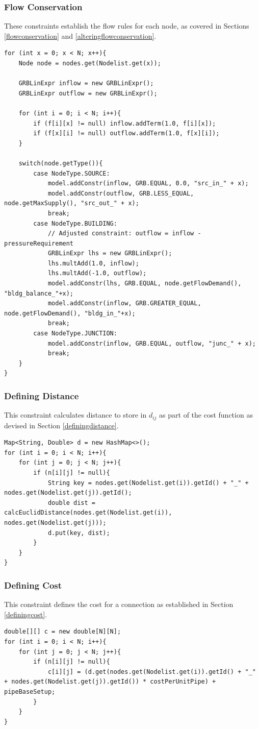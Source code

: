 \subsubsection{Flow Conservation}
These constraints establish the flow rules for each node, as covered in Sections \ref{flowconservation} and \ref{alteringflowconservation}.
\begin{lstlisting}
for (int x = 0; x < N; x++){
    Node node = nodes.get(Nodelist.get(x));

    GRBLinExpr inflow = new GRBLinExpr();
    GRBLinExpr outflow = new GRBLinExpr();

    for (int i = 0; i < N; i++){
        if (f[i][x] != null) inflow.addTerm(1.0, f[i][x]);
        if (f[x][i] != null) outflow.addTerm(1.0, f[x][i]);
    }

    switch(node.getType()){
        case NodeType.SOURCE:
            model.addConstr(inflow, GRB.EQUAL, 0.0, "src_in_" + x);
            model.addConstr(outflow, GRB.LESS_EQUAL, node.getMaxSupply(), "src_out_" + x);
            break;
        case NodeType.BUILDING:
            // Adjusted constraint: outflow = inflow - pressureRequirement
            GRBLinExpr lhs = new GRBLinExpr();
            lhs.multAdd(1.0, inflow);
            lhs.multAdd(-1.0, outflow);
            model.addConstr(lhs, GRB.EQUAL, node.getFlowDemand(), "bldg_balance_"+x);
            model.addConstr(inflow, GRB.GREATER_EQUAL, node.getFlowDemand(), "bldg_in_"+x);
            break;
        case NodeType.JUNCTION:
            model.addConstr(inflow, GRB.EQUAL, outflow, "junc_" + x);
            break;
    }
}
\end{lstlisting}

\subsubsection{Defining Distance}
This constraint calculates distance to store in $d_{ij}$ as part of the cost function as devised in Section \ref{definingdistance}.
\begin{lstlisting}
Map<String, Double> d = new HashMap<>();
for (int i = 0; i < N; i++){
    for (int j = 0; j < N; j++){
        if (n[i][j] != null){
            String key = nodes.get(Nodelist.get(i)).getId() + "_" + nodes.get(Nodelist.get(j)).getId();
            double dist = calcEuclidDistance(nodes.get(Nodelist.get(i)), nodes.get(Nodelist.get(j)));
            d.put(key, dist);
        }
    }
}
\end{lstlisting}

\subsubsection{Defining Cost}
This constraint defines the cost for a connection as established in Section \ref{definingcost}.
\begin{lstlisting}
double[][] c = new double[N][N];
for (int i = 0; i < N; i++){
    for (int j = 0; j < N; j++){
        if (n[i][j] != null){
            c[i][j] = (d.get(nodes.get(Nodelist.get(i)).getId() + "_" + nodes.get(Nodelist.get(j)).getId()) * costPerUnitPipe) + pipeBaseSetup;
        }
    }
}
\end{lstlisting}

